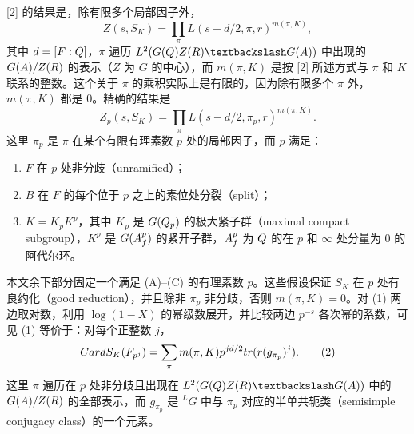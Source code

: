[2] 的结果是，除有限多个局部因子外，
\[
Z(s,S_K)=\prod_\pi L(s-d/2,\pi,r)^{m(\pi,K)},
\]
其中 $d=[F:Q]$，$\pi$ 遍历 $L^2(G(\Q)Z(\R)\backslash G(\A))$ 中出现的 $G(A)/Z(R)$ 的表示（$Z$ 为 $G$ 的中心），而 $m(\pi,K)$ 是按 [2] 所述方式与 $\pi$ 和 $K$ 联系的整数。这个关于 $\pi$ 的乘积实际上是有限的，因为除有限多个 $\pi$ 外，$m(\pi,K)$ 都是 $0$。精确的结果是
\begin{equation}
 Z_p(s,S_K)=\prod_\pi L(s-d/2,\pi_p,r)^{m(\pi,K)}.\tag{1}
\end{equation}
这里 $\pi_p$ 是 $\pi$ 在某个有限有理素数 $p$ 处的局部因子，而 $p$ 满足：
\begin{enumerate}
\item[(A)] $F$ 在 $p$ 处非分歧（unramified）；
\item[(B)] $B$ 在 $F$ 的每个位于 $p$ 之上的素位处分裂（split）；
\item[(C)] $K=K_pK^p$，其中 $K_p$ 是 $G(Q_p)$ 的极大紧子群（maximal compact subgroup），$K^p$ 是 $G(A_f^p)$ 的紧开子群，$A_f^p$ 为 $Q$ 的在 $p$ 和 $\infty$ 处分量为 $0$ 的阿代尔环。
\end{enumerate}
本文余下部分固定一个满足 (A)--(C) 的有理素数 $p$。这些假设保证 $S_K$ 在 $p$ 处有良约化（good reduction），并且除非 $\pi_p$ 非分歧，否则 $m(\pi,K)=0$。对 (1) 两边取对数，利用 $\log(1-X)$ 的幂级数展开，并比较两边 $p^{-s}$ 各次幂的系数，可见 (1) 等价于：对每个正整数 $j$，
\begin{equation}
CardS_K(F_{p^j})=\sum_\pi m(\pi,K)p^{jd/2}tr(r(g_{\pi_p})^j).\tag{2}
\end{equation}
这里 $\pi$ 遍历在 $p$ 处非分歧且出现在 $L^2(G(\Q)Z(\R)\backslash G(\A))$ 中的 $G(A)/Z(R)$ 的全部表示，而 $g_{\pi_p}$ 是 ${}^LG$ 中与 $\pi_p$ 对应的半单共轭类（semisimple conjugacy class）的一个元素。

